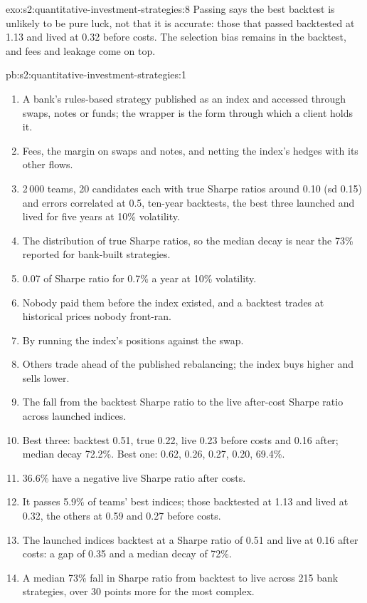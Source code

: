 \begin{solution}{exo:s2:quantitative-investment-strategies:8}
Passing says the best backtest is unlikely to be pure luck, not that it is accurate: those that passed backtested at 1.13 and lived at 0.32 before
costs. The selection bias remains in the backtest, and fees and leakage come on top.
\end{solution}

\begin{solution}{pb:s2:quantitative-investment-strategies:1}
\begin{enumerate}
\item A bank's rules-based strategy published as an index and accessed through swaps, notes or funds; the wrapper is the form through which a client
holds it.
\item Fees, the margin on swaps and notes, and netting the index's hedges with its other flows.
\item 2\,000 teams, 20 candidates each with true Sharpe ratios around 0.10 (sd 0.15) and errors correlated at 0.5, ten-year backtests, the best three
launched and lived for five years at 10\% volatility.
\item The distribution of true Sharpe ratios, so the median decay is near the 73\% reported for bank-built strategies.
\item 0.07 of Sharpe ratio for 0.7\% a year at 10\% volatility.
\item Nobody paid them before the index existed, and a backtest trades at historical prices nobody front-ran.
\item By running the index's positions against the swap.
\item Others trade ahead of the published rebalancing; the index buys higher and sells lower.
\item The fall from the backtest Sharpe ratio to the live after-cost Sharpe ratio across launched indices.
\item Best three: backtest 0.51, true 0.22, live 0.23 before costs and 0.16 after; median decay 72.2\%. Best one: 0.62, 0.26, 0.27, 0.20, 69.4\%.
\item 36.6\% have a negative live Sharpe ratio after costs.
\item It passes 5.9\% of teams' best indices; those backtested at 1.13 and lived at 0.32, the others at 0.59 and 0.27 before costs.
\item The launched indices backtest at a Sharpe ratio of 0.51 and live at 0.16 after costs: a gap of 0.35 and a median decay of 72\%.
\item A median 73\% fall in Sharpe ratio from backtest to live across 215 bank strategies, over 30 points more for the most complex.

\end{enumerate}
\end{solution}
